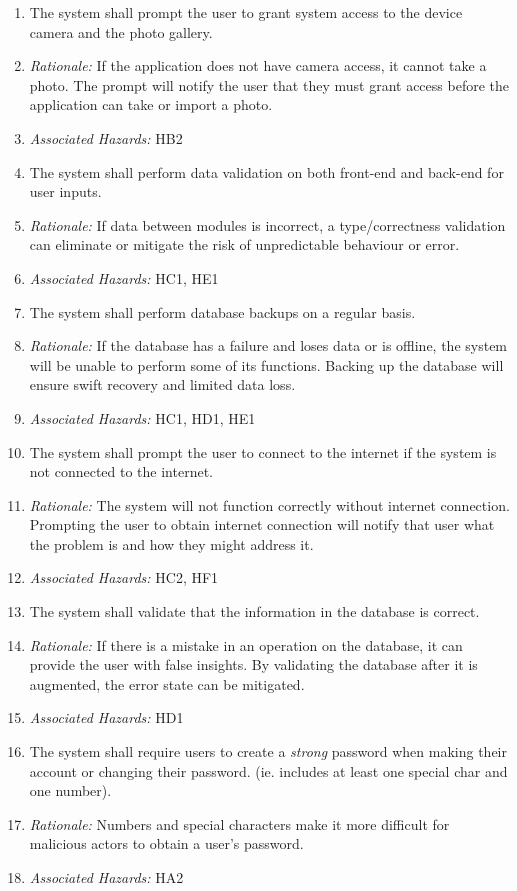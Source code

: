 \documentclass{article}
\begin{document}
\begin{enumerate}[label=SSR\arabic*.]
    \item The system shall prompt the user to grant system access to the device camera and the photo gallery.
    \item[] \emph{Rationale:} If the application does not have camera access, it cannot take a photo. The prompt will notify the user that they must grant access before the application can take or import a photo.
    \item[] \emph{Associated Hazards:} HB2

    \item The system shall perform data validation on both front-end and back-end for user inputs.
    \item[] \emph{Rationale:} If data between modules is incorrect, a type/correctness validation can eliminate or mitigate the risk of unpredictable behaviour or error.
    \item[] \emph{Associated Hazards:} HC1, HE1

    \item The system shall perform database backups on a regular basis.
    \item[] \emph{Rationale:} If the database has a failure and loses data or is offline, the system will be unable to perform some of its functions. Backing up the database will ensure swift recovery and limited data loss.
    \item[] \emph{Associated Hazards:} HC1, HD1, HE1

    \item The system shall prompt the user to connect to the internet if the system is not connected to the internet.
    \item[] \emph{Rationale:} The system will not function correctly without internet connection. Prompting the user to obtain internet connection will notify that user what the problem is and how they might address it.
    \item[] \emph{Associated Hazards:} HC2, HF1

    \item The system shall validate that the information in the database is correct.
    \item[] \emph{Rationale:} If there is a mistake in an operation on the database, it can provide the user with false insights. By validating the database after it is augmented, the error state can be mitigated.
    \item[] \emph{Associated Hazards:} HD1

    \item The system shall require users to create a \textit{strong} password when making their account or changing their password. (ie. includes at least one special char and one number).
    \item[] \emph{Rationale:} Numbers and special characters make it more difficult for malicious actors to obtain a user's password.
    \item[] \emph{Associated Hazards:} HA2


\end{enumerate}
\end{document}

